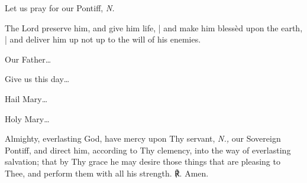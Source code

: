 \begin{otherlanguage}{english}


\noindent \vv Let us pray for our Pontiff, \textit{N.}

\noindent \rr The Lord preserve him, and give him life, | and make him blessèd upon the earth, | and deliver him up not up to the will of his enemies.

\noindent \vv Our Father…

\noindent \rr Give us this day…

\noindent \vv Hail Mary…

\noindent \rr Holy Mary…

\noindent 


Almighty, everlasting God, have mercy upon Thy servant, \textit{N.,}  our Sovereign Pontiff, and direct him, according to Thy clemency, into the way of everlasting salvation; that by Thy grace he may desire those things that are pleasing to Thee, and perform them with all his strength. ℟. Amen.



\end{otherlanguage}
